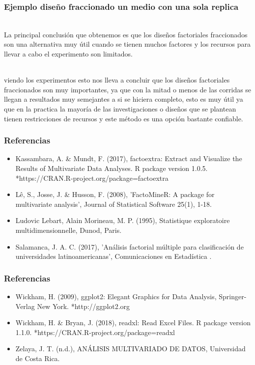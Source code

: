 \documentclass[12pt]{beamer}
\begin{document}
\begin{frame}
\frametitle{Ejemplo diseño fraccionado un medio con una sola replica}
~\\La principal conclusión que obtenemos es que los diseños factoriales fraccionados son una alternativa muy útil cuando se tienen muchos factores y los recursos para llevar a cabo el experimento son limitados.

~\\ viendo los experimentos esto nos lleva a concluir que los diseños factoriales fraccionados son muy importantes, ya que con la mitad o menos de las corridas se llegan a resultados muy semejantes a si se hiciera completo, esto es muy útil ya que en la practica la mayoría de las investigaciones o diseños que se plantean tienen restricciones de recursos y este método es una opción bastante confiable.


\end{frame}




\begin{frame}
\frametitle{Referencias}
\begin{itemize}
\item Kassambara, A. \& Mundt, F. (2017), factoextra: Extract and Visualize the Results of Multivariate
Data Analyses. R package version 1.0.5.
*https://CRAN.R-project.org/package=factoextra


\item Lê, S., Josse, J. \& Husson, F. (2008), 'FactoMineR: A package for multivariate analysis', Journal
of Statistical Software 25(1), 1-18.


\item Ludovic Lebart, Alain Morineau, M. P. (1995), Statistique exploratoire multidimensionnelle, Dunod,
Paris.

\item Salamanca, J. A. C. (2017), 'Análisis factorial múltiple para clasificación de universidades latinoamericanas', Comunicaciones en Estadística .
\end{itemize}
\end{frame}

\begin{frame}
\frametitle{Referencias}
\begin{itemize}
\item Wickham, H. (2009), ggplot2: Elegant Graphics for Data Analysis, Springer-Verlag New York.
*http://ggplot2.org


\item Wickham, H. \& Bryan, J. (2018), readxl: Read Excel Files. R package version 1.1.0.
*https://CRAN.R-project.org/package=readxl


\item Zelaya, J. T. (n.d.), ANÁLISIS MULTIVARIADO DE DATOS, Universidad de Costa Rica.
\end{itemize}
\end{frame}
\end{document}
